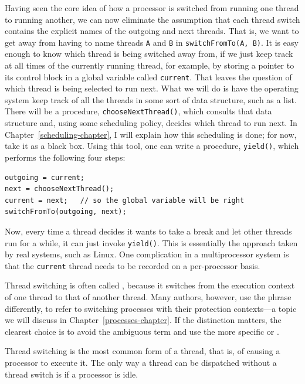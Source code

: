 Having seen the core idea of how a processor is switched from running
one thread to running another, we can now eliminate the assumption
that each thread switch contains the explicit names of the outgoing
and next threads.  That is, we want to get away from having to name
threads \verb|A| and \verb|B| in
\verb|switchFromTo(A, B)|.  It is easy enough to know
which thread is being switched away from, if we just keep track at all
times of the currently running thread, for example, by storing a
pointer to its control block in a global variable called
\verb|current|.  That leaves the question of which thread is being
selected to run next.  What we will do is have the operating system
keep track of all the threads in some sort of data structure, such as
a list.  There will be a procedure, \verb|chooseNextThread()|, which
consults that data structure and, using some scheduling policy, decides
which thread to run next.  In Chapter~\ref{scheduling-chapter}, I will explain how
this scheduling is done; for now, take it as a black box.
Using this tool, one can write a procedure, \verb|yield()|, which
performs the following four steps:
\begin{verbatim}
outgoing = current;
next = chooseNextThread();
current = next;   // so the global variable will be right
switchFromTo(outgoing, next);
\end{verbatim}
Now, every
time a thread decides it wants to take a break and let other threads
run for a while, it can just invoke \verb|yield()|.
This is essentially the approach taken by real systems, such as Linux.
One complication in a multiprocessor system is that the \verb|current|
thread needs to be recorded on a per-processor basis.

Thread switching is often called , because it
switches from the execution context of one thread to that of another
thread.  Many authors, however, use the phrase  differently,
to refer to switching processes with their protection contexts---a
topic we will discuss in Chapter~\ref{processes-chapter}.  If the distinction matters,
the clearest choice is to avoid the ambiguous term
 and use the more specific  or
.

Thread switching is the most common form of
 a thread, that is, of causing a processor to
execute it.  The only way a thread can be dispatched without a thread switch
is if a processor is idle.

